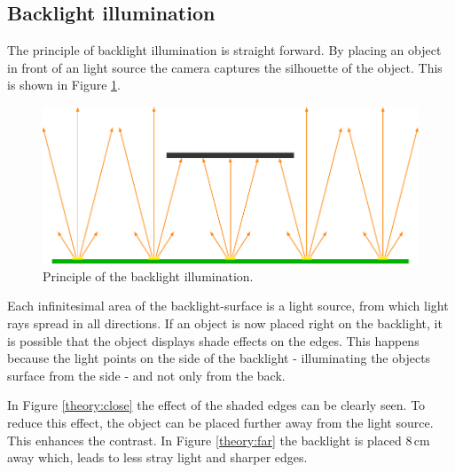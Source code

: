 \subsection{Backlight illumination}
The principle of backlight illumination is straight forward.
By placing an object in front of an light source the camera captures the silhouette of the object.
This is shown in Figure \ref{theory:backlight}.
\begin{figure}[ht]
	\centering
	\includegraphics[width=0.9\linewidth]{2-theory/backlight/object.pdf}
	\caption{Principle of the backlight illumination.\label{theory:backlight}}	
\end{figure}

Each infinitesimal area of the backlight-surface is a light source, from which light rays spread in all directions.
If an object is now placed right on the backlight, it is possible that the object displays shade effects on the edges.
This happens because the light points on the side of the backlight - illuminating the objects surface from the side - and not only from the back. 

In Figure \ref{theory:close} the effect of the shaded edges can be clearly seen.
To reduce this effect, the object can be placed further away from the light source.
This enhances the contrast.
In Figure \ref{theory:far} the backlight is placed 8\,cm away which, leads to less stray light and sharper edges.

